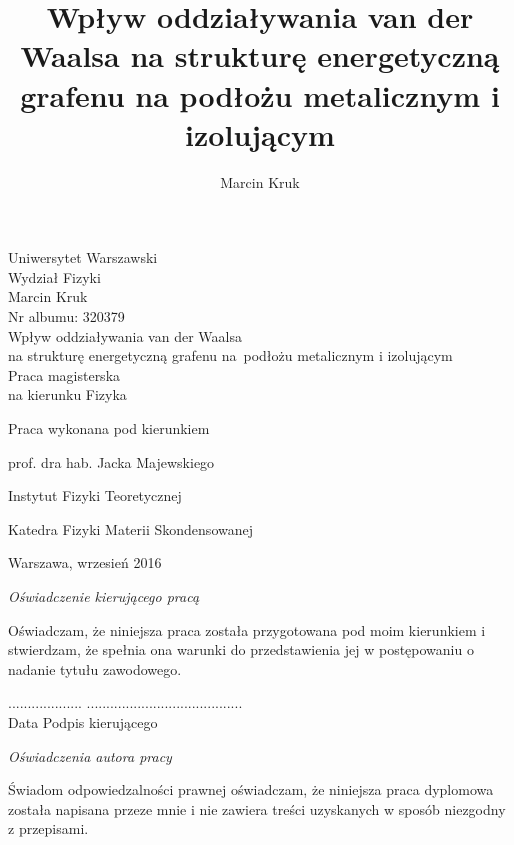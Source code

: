 \documentclass[a4paper,12pt]{article}
\title{Wpływ oddziaływania van der Waalsa na strukturę energetyczną grafenu na podłożu metalicznym i izolującym}
\author{Marcin Kruk}
\date{}
\numberwithin{equation}{section}
\numberwithin{table}{section}
\numberwithin{figure}{section}
\begin{document}
%
%
\newpage
\thispagestyle{empty}
\vspace*{2cm}
\begin{center}
{\huge Uniwersytet Warszawski\\ \vspace{0.3cm}
Wydział Fizyki}\\
\vspace{1.5cm}
Marcin Kruk\\
Nr albumu: 320379\\
\vspace{1.5cm}
{\huge Wpływ oddziaływania van der Waalsa\\
	na strukturę energetyczną grafenu
	\mbox{na podłożu} metalicznym i izolującym}\\

\vspace{2cm}
Praca magisterska\\
na kierunku Fizyka
\end{center}
\vspace{3cm}
\hfill Praca wykonana pod kierunkiem \vspace{0.2cm}


\hfill prof. dra hab. Jacka Majewskiego

\hfill Instytut Fizyki Teoretycznej

\hfill Katedra Fizyki Materii Skondensowanej
\vfill
\begin{center}
{\large Warszawa, wrzesień 2016}\\
\end{center}
%
%
%
%
\newpage
\thispagestyle{empty}
\vspace*{2cm}
\noindent
\emph{Oświadczenie kierującego pracą}
\vspace{0.6cm}


\noindent Oświadczam, że niniejsza praca została przygotowana pod moim kierunkiem i stwierdzam, że spełnia ona warunki do przedstawienia jej w postępowaniu o nadanie tytułu zawodowego.
\vspace{1cm}

\noindent ................... \hfill ........................................\\
 Data \hfill Podpis kierującego
\vspace{3cm}

\noindent \emph{Oświadczenia autora pracy}
\vspace{0.6cm}


\noindent Świadom odpowiedzalności prawnej oświadczam, że niniejsza praca dyplomowa została napisana przeze mnie i nie zawiera treści uzyskanych w sposób niezgodny z przepisami.
\vspace{0.3cm}
\end{document}
